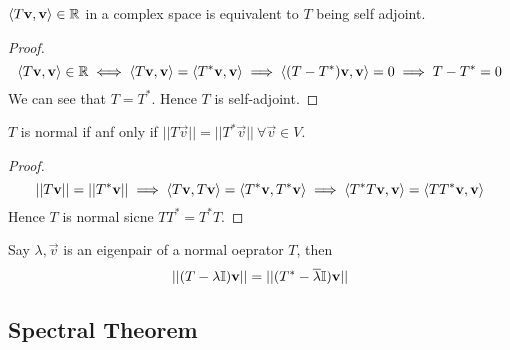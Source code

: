 \begin{corollary}
	$\langle T \mathbf v, \mathbf v \rangle \in \mathbb R$ in a complex space is equivalent to $T$ being self adjoint.
\end{corollary}
\begin{proof}
	\[ \langle T \mathbf v, \mathbf v \rangle \in \mathbb R \iff \langle T\mathbf v, \mathbf v\rangle = \langle T^*\mathbf v, \mathbf v \rangle \implies \langle (T - T^*)\mathbf v, \mathbf v\rangle = 0 \implies T - T^* = 0\]
	We can see that $T = T^*$. Hence $T$ is self-adjoint.
\end{proof}

\begin{theorem}
	$T$ is normal if anf only if $||T\vec v|| = ||T^* \vec v|| \ \forall \vec v \in V$.
\end{theorem}
\begin{proof}
	\[ ||T\mathbf v|| = ||T^* \mathbf v|| \implies \langle T\mathbf v, T\mathbf v\rangle = \langle T^* \mathbf v, T^* \mathbf v \rangle \implies \langle T^* T \mathbf v, \mathbf v \rangle = \langle TT^* \mathbf v, \mathbf v \rangle\]
	Hence $T$ is normal sicne $TT^* = T^*T$.
\end{proof}
\begin{theorem}
	Say $\lambda, \vec v$ is an eigenpair of a normal oeprator $T$, then 
	\[ ||(T - \lambda \mathbb I) \mathbf v ||=||(T^* - \overline \lambda \mathbb I)\mathbf v||\]
\end{theorem}
\subsection{Spectral Theorem}
